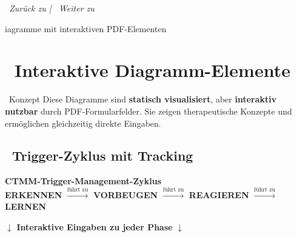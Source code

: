 \begin{center}
\textit{\textcolor{ctmmBlue}{\faChevronRight~Zurück zu}  | \textcolor{ctmmGreen}{\faChevronRight~Weiter zu} }
\end{center}iagramme mit interaktiven PDF-Elementen

\section*{\textcolor{ctmmBlue}{\faChartBar~Interaktive Diagramm-Elemente}}
\label{sec:interactive-diagrams}

\begin{ctmmBlueBox}{\faLightbulb~Konzept}
Diese Diagramme sind \textbf{statisch visualisiert}, aber \textbf{interaktiv nutzbar} durch PDF-Formularfelder. Sie zeigen therapeutische Konzepte und ermöglichen gleichzeitig direkte Eingaben.
\end{ctmmBlueBox}

\subsection*{\faSync~Trigger-Zyklus mit Tracking}

\begin{center}
\begin{tcolorbox}[colback=white,colframe=ctmmBlue,width=14cm]
\centering
\textbf{CTMM-Trigger-Management-Zyklus}\\[0.5cm]

\textcolor{ctmmBlue}{\Large\faEye} \textbf{ERKENNEN} 
$\xrightarrow{\text{führt zu}}$ 
\textcolor{ctmmGreen}{\Large\faShield} \textbf{VORBEUGEN} 
$\xrightarrow{\text{führt zu}}$ 
\textcolor{ctmmOrange}{\Large\faExclamationTriangle} \textbf{REAGIEREN} 
$\xrightarrow{\text{führt zu}}$ 
\textcolor{ctmmPurple}{\Large\faBrain} \textbf{LERNEN}\\[0.3cm]

\begin{small}
$\downarrow$ \textbf{Interaktive Eingaben zu jeder Phase} $\downarrow$
\end{small}
\end{tcolorbox}
\end{center}


